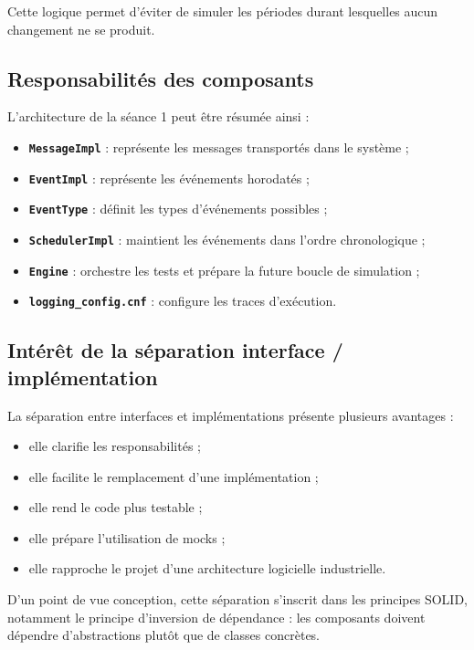\documentclass{article}
\begin{document}
Cette logique permet d’éviter de simuler les périodes durant lesquelles aucun changement ne se produit.

\subsection{Responsabilités des composants}

L’architecture de la séance 1 peut être résumée ainsi :

\begin{itemize}[leftmargin=*]
    \item \textbf{\texttt{MessageImpl}} : représente les messages transportés dans le système ;
    \item \textbf{\texttt{EventImpl}} : représente les événements horodatés ;
    \item \textbf{\texttt{EventType}} : définit les types d’événements possibles ;
    \item \textbf{\texttt{SchedulerImpl}} : maintient les événements dans l’ordre chronologique ;
    \item \textbf{\texttt{Engine}} : orchestre les tests et prépare la future boucle de simulation ;
    \item \textbf{\texttt{logging\_config.cnf}} : configure les traces d’exécution.
\end{itemize}

\subsection{Intérêt de la séparation interface / implémentation}

La séparation entre interfaces et implémentations présente plusieurs avantages :
\begin{itemize}[leftmargin=*]
    \item elle clarifie les responsabilités ;
    \item elle facilite le remplacement d’une implémentation ;
    \item elle rend le code plus testable ;
    \item elle prépare l’utilisation de mocks ;
    \item elle rapproche le projet d’une architecture logicielle industrielle.
\end{itemize}

D’un point de vue conception, cette séparation s’inscrit dans les principes SOLID, notamment le principe d’inversion de dépendance : les composants doivent dépendre d’abstractions plutôt que de classes concrètes.
\end{document}
